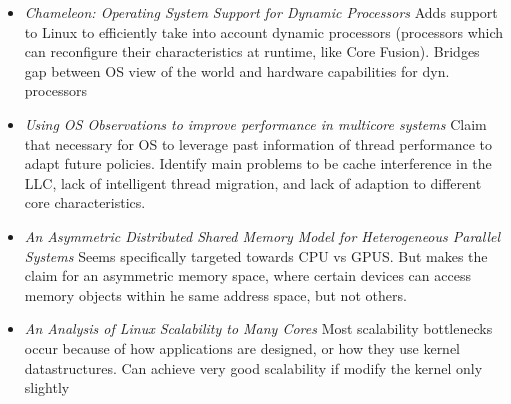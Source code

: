 \begin{itemize}
\item \emph{Chameleon: Operating System Support for Dynamic Processors}
Adds support to Linux to efficiently take into account dynamic processors (processors
which can reconfigure their characteristics at runtime, like Core Fusion).
Bridges gap between OS view of the world and hardware capabilities for dyn.
processors \cite{Panneerselvam:2012:COS:2189750.2150988}
\item \emph{Using OS Observations to improve performance in multicore systems}
Claim that necessary for OS to leverage past information of thread performance
to adapt future policies. Identify main problems to be cache interference in the LLC,
lack of intelligent thread migration, and lack of adaption to different
core characteristics. \cite{knauerhase2008using}
\item \emph{An Asymmetric Distributed Shared Memory Model for Heterogeneous Parallel Systems}
Seems specifically targeted towards CPU vs GPUS. But makes the claim for an asymmetric
memory space, where certain devices can access memory objects within he same address space,
but not others. \cite{Gelado:2010:ADS:1736020.1736059}
\item \emph{An Analysis of Linux Scalability to Many Cores} Most scalability bottlenecks
occur because of how applications are designed, or how they use kernel datastructures.
Can achieve very good scalability if modify the kernel only slightly \cite{boyd2010analysis} 
\end{itemize} 
